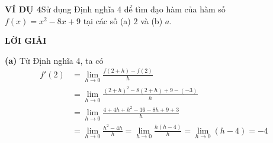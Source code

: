 \begin{minipage}[t]{0.72\textwidth}
\vspace{0.8em}
\noindent\textbf{\textsf{\color{stewartcyan}VÍ DỤ 4}}\hspace{0.8em}Sử dụng Định nghĩa 4 để tìm đạo hàm của hàm số $f(x) = x^2 - 8x + 9$ tại các số (a) $2$ và (b) $a$.

\vspace{0.5em}
\noindent\textbf{\textsf{\color{stewartcyan}LỜI GIẢI}}

\vspace{0.2em}
\noindent\textbf{(a)} Từ Định nghĩa 4, ta có
\begin{align*}
f'(2) &= \lim_{h \to 0} \frac{f(2+h) - f(2)}{h} \\[4pt]
&= \lim_{h \to 0} \frac{(2+h)^2 - 8(2+h) + 9 - (-3)}{h} \\[4pt]
&= \lim_{h \to 0} \frac{4 + 4h + h^2 - 16 - 8h + 9 + 3}{h} \\[4pt]
&= \lim_{h \to 0} \frac{h^2 - 4h}{h} = \lim_{h \to 0} \frac{h(h - 4)}{h} = \lim_{h \to 0} (h - 4) = -4
\end{align*}
\end{minipage}
